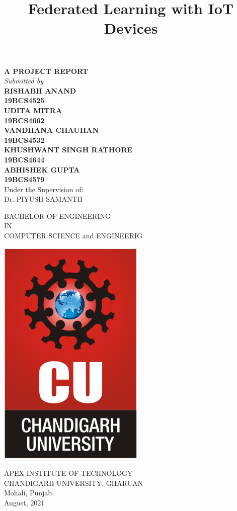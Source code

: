 \documentclass[14pt]{extarticle}
\title{Federated Learning with IoT Devices}
\author{}
\date{}
\newcommand\frontmatter{
    \cleardoublepage
    \pagenumbering{roman}
}
\begin{document}
\frontmatter

\maketitle

\vspace{-7em}

\begin{center}
    \singlespacing
\textbf {A PROJECT REPORT} \\
\emph {Submitted by} \\
\textbf {RISHABH ANAND} \\
\textbf {19BCS4525 }   \\
\textbf{UDITA MITRA} \\
\textbf{19BCS4662} \\
\textbf{VANDHANA CHAUHAN} \\
\textbf{19BCS4532} \\
\textbf{KHUSHWANT SINGH RATHORE} \\
\textbf{19BCS4644} \\
\textbf{ABHISHEK GUPTA} \\
\textbf{19BCS4579} \\

\vspace{1.5em }
Under the Supervision of:\\
Dr. PIYUSH SAMANTH

\singlespacing

BACHELOR OF ENGINEERING \\
IN \\
COMPUTER SCIENCE and ENGINEERIG

\vspace{1em}
\includegraphics[scale=0.25]{private/seal.png}

\singlespacing

APEX INSTITUTE OF TECHNOLOGY\\
CHANDIGARH UNIVERSITY, GHARUAN\\
Mohali, Punjab \\

\onehalfspacing
August, 2021

\end{center}
\end{document}
